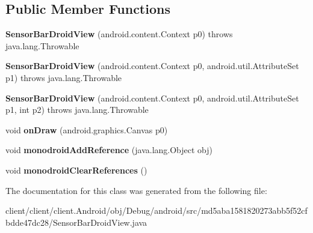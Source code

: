 \subsection*{Public Member Functions}
\begin{DoxyCompactItemize}
\item 
\hypertarget{classmd5aba1581820273abb5f52cfbdde47dc28_1_1SensorBarDroidView_a5ba0c8c63dab3df170a5c8b6d1b00cd8}{}{\bfseries Sensor\+Bar\+Droid\+View} (android.\+content.\+Context p0)  throws java.\+lang.\+Throwable 	\label{classmd5aba1581820273abb5f52cfbdde47dc28_1_1SensorBarDroidView_a5ba0c8c63dab3df170a5c8b6d1b00cd8}

\item 
\hypertarget{classmd5aba1581820273abb5f52cfbdde47dc28_1_1SensorBarDroidView_a8c8c4bb5463c7304c538f25b451399f0}{}{\bfseries Sensor\+Bar\+Droid\+View} (android.\+content.\+Context p0, android.\+util.\+Attribute\+Set p1)  throws java.\+lang.\+Throwable 	\label{classmd5aba1581820273abb5f52cfbdde47dc28_1_1SensorBarDroidView_a8c8c4bb5463c7304c538f25b451399f0}

\item 
\hypertarget{classmd5aba1581820273abb5f52cfbdde47dc28_1_1SensorBarDroidView_a7d8558a16661fbdf4e1144c074001636}{}{\bfseries Sensor\+Bar\+Droid\+View} (android.\+content.\+Context p0, android.\+util.\+Attribute\+Set p1, int p2)  throws java.\+lang.\+Throwable 	\label{classmd5aba1581820273abb5f52cfbdde47dc28_1_1SensorBarDroidView_a7d8558a16661fbdf4e1144c074001636}

\item 
\hypertarget{classmd5aba1581820273abb5f52cfbdde47dc28_1_1SensorBarDroidView_a085252ed3f64c8ae4923129b6fedcc73}{}void {\bfseries on\+Draw} (android.\+graphics.\+Canvas p0)\label{classmd5aba1581820273abb5f52cfbdde47dc28_1_1SensorBarDroidView_a085252ed3f64c8ae4923129b6fedcc73}

\item 
\hypertarget{classmd5aba1581820273abb5f52cfbdde47dc28_1_1SensorBarDroidView_ade8057e76c1e7537063f1a34e59827ea}{}void {\bfseries monodroid\+Add\+Reference} (java.\+lang.\+Object obj)\label{classmd5aba1581820273abb5f52cfbdde47dc28_1_1SensorBarDroidView_ade8057e76c1e7537063f1a34e59827ea}

\item 
\hypertarget{classmd5aba1581820273abb5f52cfbdde47dc28_1_1SensorBarDroidView_ab1037e74ce75a5d28a94230301113486}{}void {\bfseries monodroid\+Clear\+References} ()\label{classmd5aba1581820273abb5f52cfbdde47dc28_1_1SensorBarDroidView_ab1037e74ce75a5d28a94230301113486}

\end{DoxyCompactItemize}


The documentation for this class was generated from the following file\+:\begin{DoxyCompactItemize}
\item 
client/client/client.\+Android/obj/\+Debug/android/src/md5aba1581820273abb5f52cfbdde47dc28/Sensor\+Bar\+Droid\+View.\+java\end{DoxyCompactItemize}
